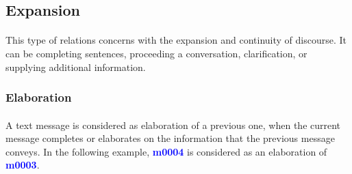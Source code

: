 \documentclass{article}
\begin{document}
\subsection{Expansion}
\paragraph{}
This type of relations concerns with the expansion and continuity of discourse. It can be completing sentences, proceeding a conversation, clarification, or supplying additional information.

\subsubsection{Elaboration}
\paragraph{} 
A text message is considered as elaboration of a previous one, when the current message completes or elaborates on the information that the previous message conveys. In the following example, \textbf{\textcolor{blue}{m0004}} is considered as an elaboration of \textbf{\textcolor{blue}{m0003}}. 
\end{document}
